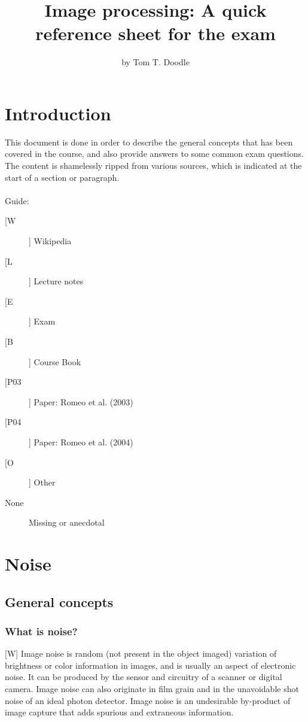 \documentclass[12pt]{article}
\title{Image processing: A quick reference sheet for the exam}
\author{by Tom T. Doodle}
\begin{document}
\maketitle
\newpage
\tableofcontents
\newpage

\section{Introduction}
	This document is done in order to describe the general concepts
	that has been covered in the course, and also provide answers to
	some common exam questions. The content is shamelessly ripped from
	various sources, which is indicated at the start of a section
	or paragraph.\\
	\\	
	Guide:
	\begin{description}
		\item[[W]] Wikipedia
		\item[[L]] Lecture notes
		\item[[E]] Exam
		\item[[B]] Course Book
		\item[[P03]] Paper: Romeo et al. (2003)
		\item[[P04]] Paper: Romeo et al. (2004) 
		\item[[O]] Other
		\item[None] Missing or anecdotal
	\end{description}
	
%	
%
\section{Noise}
	\subsection{General concepts}
	\subsubsection{What is noise?}
	
	[W] Image noise is random (not present in the object imaged) variation of brightness or
	color information in images, and is usually an aspect of electronic noise. It can be
	produced by the sensor and circuitry of a scanner or digital camera. Image noise can
	also originate in film grain and in the unavoidable shot noise of an ideal photon 
	detector. Image noise is an undesirable by-product of image capture that adds spurious 
	and extraneous information.\\
	
\end{document}

